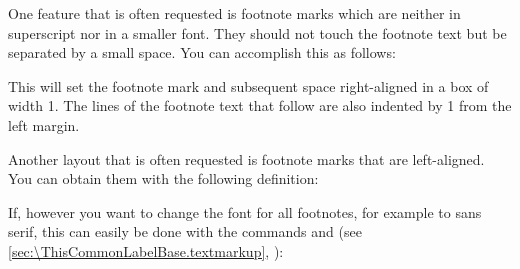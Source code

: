 \IfThisCommonFirstRun{\iftrue}{\csname iffalse\endcsname}%
  \begin{Example}
    One feature that is often requested is footnote marks
    which are neither in superscript nor in a smaller font. They should not
    touch the footnote text but be separated by a small space. You can
    accomplish this as follows:
\begin{lstcode}
\end{lstcode}
    This will set the footnote mark and subsequent space right-aligned in a
    box of width 1. The lines of the footnote text that follow are
    also indented by 1 from the left margin.

    Another layout that is often requested is footnote marks
    that are left-aligned. You can obtain them with the following
    definition:
\begin{lstcode}
\end{lstcode}

    If, however you want to change the font for all footnotes, for example
    to sans serif, this can easily be done with the commands
     and
     (see
    \autoref{sec:\ThisCommonLabelBase.textmarkup},
    ):
\begin{lstcode}
\end{lstcode}
  \end{Example}%
\fi%
%
%
\EndIndexGroup
\EndIndexGroup

